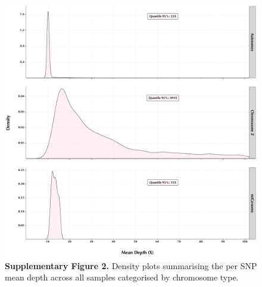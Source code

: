 \documentclass[twoside, british, a4paper]{article}
\begin{document}
\begin{figure}
\centering
\includegraphics[width=1\textwidth]{../Y150239Genomics--Pipeline/Y150239Genomics--Plots/Y150239Genomics--Stats/Y150239Genomics--MeanDepth.pdf}
\captionsetup{labelformat=empty}
\caption[\textbf{Supplementary Figure 2.}]{\textbf{Supplementary Figure 2.} Density plots summarising the per SNP mean depth across all samples categorised by chromosome type.}
\label{SI:Y150239Genomics--MeanDepth}
\end{figure}
\end{document}
